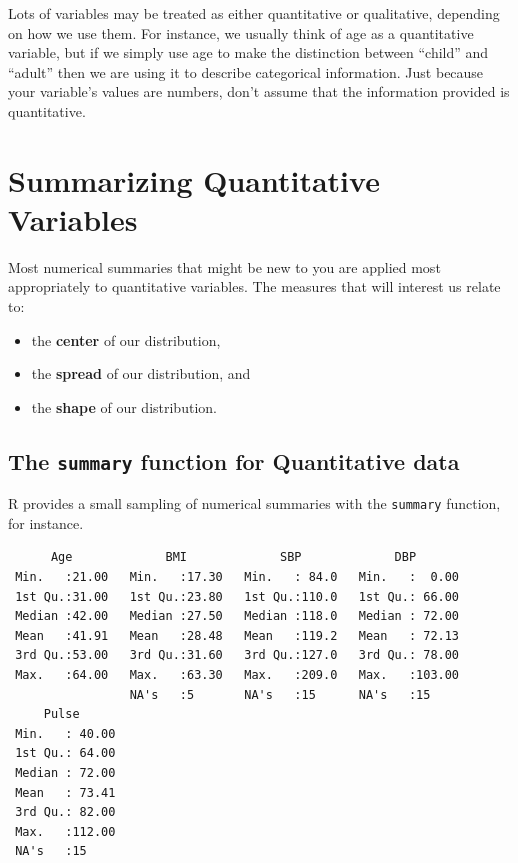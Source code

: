\documentclass[
]{book}
\newenvironment{Shaded}{\begin{snugshade}}{\end{snugshade}}
\newcommand{\KeywordTok}[1]{\textcolor[rgb]{0.13,0.29,0.53}{\textbf{#1}}}
\newcommand{\NormalTok}[1]{#1}
\newcommand{\OperatorTok}[1]{\textcolor[rgb]{0.81,0.36,0.00}{\textbf{#1}}}
\newcommand{\StringTok}[1]{\textcolor[rgb]{0.31,0.60,0.02}{#1}}
\providecommand{\tightlist}{%
  \setlength{\itemsep}{0pt}\setlength{\parskip}{0pt}}
\begin{document}
Lots of variables may be treated as either quantitative or qualitative, depending on how we use them. For instance, we usually think of age as a quantitative variable, but if we simply use age to make the distinction between ``child'' and ``adult'' then we are using it to describe categorical information. Just because your variable's values are numbers, don't assume that the information provided is quantitative.

\hypertarget{summarizing_quantities}{%
\chapter{Summarizing Quantitative Variables}\label{summarizing_quantities}}

Most numerical summaries that might be new to you are applied most appropriately to quantitative variables. The measures that will interest us relate to:

\begin{itemize}
\tightlist
\item
  the \textbf{center} of our distribution,
\item
  the \textbf{spread} of our distribution, and
\item
  the \textbf{shape} of our distribution.
\end{itemize}

\hypertarget{the-summary-function-for-quantitative-data}{%
\section{\texorpdfstring{The \texttt{summary} function for Quantitative data}{The summary function for Quantitative data}}\label{the-summary-function-for-quantitative-data}}

R provides a small sampling of numerical summaries with the \texttt{summary} function, for instance.

\begin{Shaded}
\end{Shaded}

\begin{verbatim}
      Age             BMI             SBP             DBP        
 Min.   :21.00   Min.   :17.30   Min.   : 84.0   Min.   :  0.00  
 1st Qu.:31.00   1st Qu.:23.80   1st Qu.:110.0   1st Qu.: 66.00  
 Median :42.00   Median :27.50   Median :118.0   Median : 72.00  
 Mean   :41.91   Mean   :28.48   Mean   :119.2   Mean   : 72.13  
 3rd Qu.:53.00   3rd Qu.:31.60   3rd Qu.:127.0   3rd Qu.: 78.00  
 Max.   :64.00   Max.   :63.30   Max.   :209.0   Max.   :103.00  
                 NA's   :5       NA's   :15      NA's   :15      
     Pulse       
 Min.   : 40.00  
 1st Qu.: 64.00  
 Median : 72.00  
 Mean   : 73.41  
 3rd Qu.: 82.00  
 Max.   :112.00  
 NA's   :15      
\end{verbatim}
\end{document}
